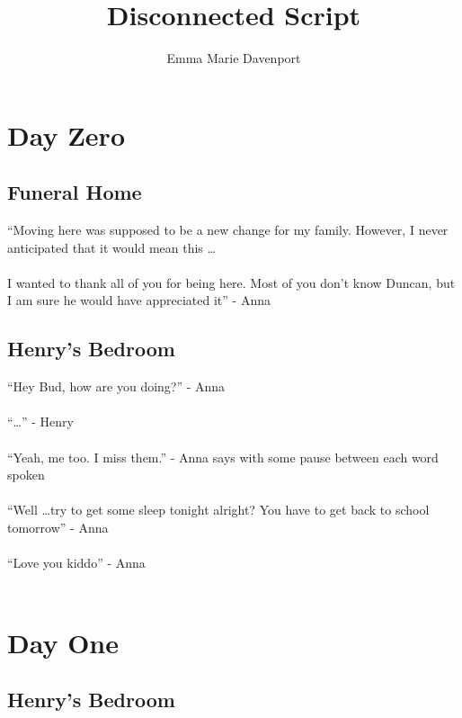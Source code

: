 \documentclass[12pt, a4paper, titlepage]{article}
\author{Emma Marie Davenport}
\title{Disconnected Script}
\begin{document}
    \maketitle
    
    \section{Day Zero}

        \subsection{Funeral Home}

            ``Moving here was supposed to be a new change for my family. 
            However, I never anticipated that it would mean this \ldots\\~\\
	    I wanted to thank all of you for being here. Most of you
            don't know Duncan, but I am sure he would have appreciated it'' - Anna

        \subsection{Henry's Bedroom}

            ``Hey Bud, how are you doing?'' - Anna\\~\\
            ``\ldots'' - Henry\\~\\
            ``Yeah, me too. I miss them.'' - Anna says with some pause between each word spoken\\~\\
            ``Well \ldots try to get some sleep tonight alright? You have to get back to school tomorrow'' - Anna\\~\\
            ``Love you kiddo'' - Anna\\~\\
            
	\section{Day One}

        \subsection{Henry's Bedroom}
\end{document}
